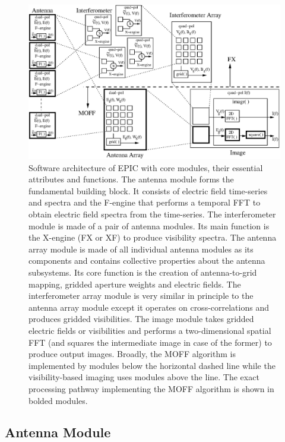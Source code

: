 \documentclass[a4paper,fleqn,usenatbib]{mnras}
\begin{document}
\begin{figure}
  \includegraphics[width=\linewidth]{figureA1}
  \caption{Software architecture of EPIC with core modules, their essential attributes and functions. The antenna module forms the fundamental building block. It consists of electric field time-series and spectra and the F-engine that performs a temporal FFT to obtain electric field spectra from the time-series. The interferometer module is made of a pair of antenna modules. Its main function is the X-engine (FX or XF) to produce visibility spectra. The antenna array module is made of all individual antenna modules as its components and contains collective properties about the antenna subsystems. Its core function is the creation of antenna-to-grid mapping, gridded aperture weights and electric fields. The interferometer array module is very similar in principle to the antenna array module except it operates on cross-correlations and produces gridded visibilities. The image module takes gridded electric fields or visibilities and performs a two-dimensional spatial FFT (and squares the intermediate image in case of the former) to produce output images. Broadly, the MOFF algorithm is implemented by modules below the horizontal dashed line while the visibility-based imaging uses modules above the line. The exact processing pathway implementing the MOFF algorithm is shown in bolded modules.}
  \label{fig:software-modules}
\end{figure}

\subsection{Antenna Module}
\end{document}
